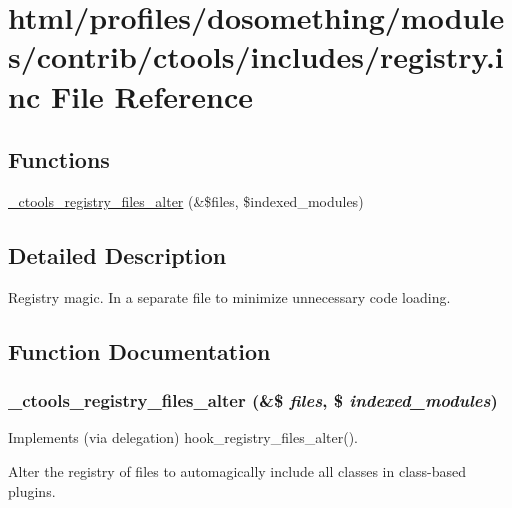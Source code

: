 \hypertarget{registry_8inc}{
\section{html/profiles/dosomething/modules/contrib/ctools/includes/registry.inc File Reference}
\label{registry_8inc}
}
\subsection*{Functions}
\begin{DoxyCompactItemize}
\item 
\hyperlink{registry_8inc_ad891df9720627ddeaa3d95698e764854}{\_\-ctools\_\-registry\_\-files\_\-alter} (\&\$files, \$indexed\_\-modules)
\end{DoxyCompactItemize}


\subsection{Detailed Description}
Registry magic. In a separate file to minimize unnecessary code loading. 

\subsection{Function Documentation}
\hypertarget{registry_8inc_ad891df9720627ddeaa3d95698e764854}{
\subsubsection[{\_\-ctools\_\-registry\_\-files\_\-alter}]{\setlength{\rightskip}{0pt plus 5cm}\_\-ctools\_\-registry\_\-files\_\-alter (\&\$ {\em files}, \/  \$ {\em indexed\_\-modules})}}
\label{registry_8inc_ad891df9720627ddeaa3d95698e764854}
Implements (via delegation) hook\_\-registry\_\-files\_\-alter().

Alter the registry of files to automagically include all classes in class-\/based plugins. 